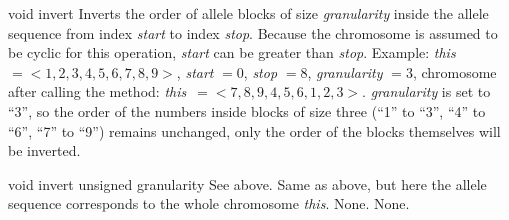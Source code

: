     \setCorrectWidthThree{8pt}
    \printMethodWithParamsSaved
        {void}
        {}
        {invert}
        {Inverts the order of allele blocks of size {\em granularity} 
         inside the allele sequence from index {\em start} to index
         {\em stop}. Because the chromosome is assumed to be cyclic
         for this operation,
         {\em start} can be greater than {\em stop}.
         Example: {\em this} $= < 1, 2, 3, 4, 5, 6, 7, 8, 9 >$,
         {\em start} $= 0$, {\em stop} $= 8$, {\em granularity} $= 3$,
         chromosome after calling the method: {\em this}\ 
         $= < 7, 8, 9, 4, 5, 6, 1, 2, 3 >$. {\em granularity} is set to
         ``3'', so the order of the numbers inside blocks of size three
         (``1'' to ``3'', ``4'' to ``6'',
         ``7'' to ``9'') remains unchanged, only the order of the blocks
         themselves will be inverted.}
        {}
    \setCorrectWidthThree{4pt}

\vspace*{4ex}

\index{invert!( unsigned granularity )}
    \printMethodWithOneParam
    {void} 
    {invert}
    {unsigned} 
    {granularity}
    {See above.}
    {Same as above, but here the allele sequence corresponds to
     the whole chromosome {\em this}.}
    {None.}
    {None.}

\vspace*{4ex}


